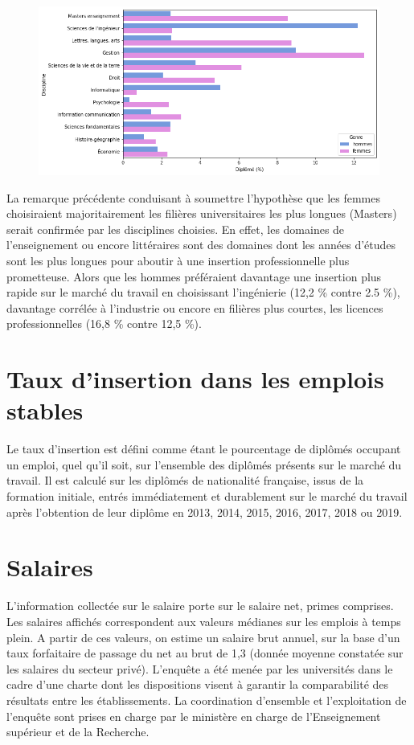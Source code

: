 \documentclass[12pt, a4paper, titlepage, table]{article}
\begin{document}
	\begin{figure}[H]
		\centering
		\includegraphics[width=1\textwidth]{../graphs/proportion_disciplines.png}
		\label{fig:genre_discipline}
	\end{figure}

	La remarque précédente conduisant à soumettre l'hypothèse que les femmes choisiraient majoritairement les filières universitaires les plus longues (Masters) serait confirmée par les disciplines choisies.
	En effet, les domaines de l'enseignement ou encore littéraires sont des domaines dont les années d'études sont les plus longues pour aboutir à une insertion professionnelle plus prometteuse.
	Alors que les hommes préféraient davantage une insertion plus rapide sur le marché du travail en choisissant l'ingénierie (12,2 \% contre 2.5 \%), davantage corrélée à l'industrie ou encore en filières plus courtes, les licences professionnelles (16,8 \% contre 12,5 \%). 

\section{Taux d'insertion dans les emplois stables}

Le taux d’insertion est défini comme étant le pourcentage de diplômés occupant un emploi, quel qu’il soit, sur l’ensemble des diplômés présents sur le marché du travail. Il est calculé sur les diplômés de nationalité française, issus de la formation initiale, entrés immédiatement et durablement sur le marché du travail après l’obtention de leur diplôme en 2013, 2014, 2015, 2016, 2017, 2018 ou 2019.



\section{Salaires}
L’information collectée sur le salaire porte sur le salaire net, primes comprises. Les salaires affichés correspondent aux valeurs médianes sur les emplois à temps plein. A partir de ces valeurs, on estime un salaire brut annuel, sur la base d’un taux forfaitaire de passage du net au brut de 1,3 (donnée moyenne constatée sur les salaires du secteur privé).
L’enquête a été menée par les universités dans le cadre d’une charte dont les dispositions visent à garantir la comparabilité des résultats entre les établissements. La coordination d’ensemble et l’exploitation de l’enquête sont prises en charge par le ministère en charge de l'Enseignement supérieur et de la Recherche.
\end{document}
